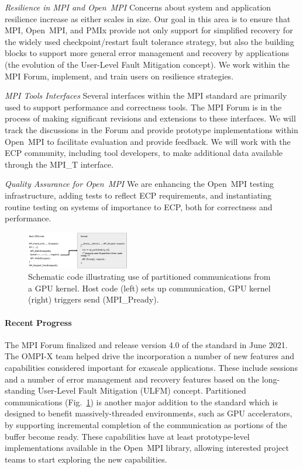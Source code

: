 \emph{Resilience in MPI and Open~MPI} Concerns about system and
application resilience increase as either scales in size.  Our goal in
this area is to ensure that MPI, Open~MPI, and PMIx provide not only
support for simplified
recovery for the widely used checkpoint/restart fault tolerance strategy, but also the building
blocks to support more general error management and recovery by applications (the evolution of the User-Level
Fault Mitigation concept). We work within the MPI Forum, implement,
and train users on resilience strategies.

\emph{MPI Tools Interfaces}  Several interfaces within the
MPI standard are primarily used to support performance and
correctness tools.
The MPI Forum is in the process
of making significant revisions and extensions to these interfaces.
We will track the discussions in the Forum and provide prototype
implementations within Open~MPI to facilitate evaluation and provide
feedback.
We will work with the
ECP community, including tool developers, to make additional data
available through the MPI\_T interface.

\emph{Quality Assurance for Open~MPI}  We are enhancing the
Open~MPI testing infrastructure, adding tests to reflect ECP
requirements, and instantiating routine testing on systems of
importance to ECP, both for correctness and performance.

\begin{figure}
    \includegraphics[width=0.40\textwidth]{projects/2.3.1-PMR/2.3.1.17-OMPI-X/partitioned-comms-code.jpg}
    \caption{Schematic code illustrating use of partitioned communications from a GPU kernel.  
    Host code (left) sets up communication, GPU kernel (right) triggers send (MPI\_Pready).}
    \label{fig:partitioned-communications}
\end{figure}

\paragraph{Recent Progress}
The MPI Forum finalized and release version 4.0 of the standard in June 2021.  The OMPI-X team helped drive
the incorporation a number of new features and capabilities considered important for exascale applications.
These include sessions and a number of error management and recovery features
based on the long-standing User-Level Fault Mitigation (ULFM) concept.  Partitioned communications (Fig.~\ref{fig:partitioned-communications})
is another major addition to the standard which is designed to benefit massively-threaded environments, such as GPU accelerators, by supporting
incremental completion of the communication as portions of the buffer become ready.
These capabilities have at least prototype-level implementations available in the Open~MPI library, allowing interested project teams to start
exploring the new capabilities.  

